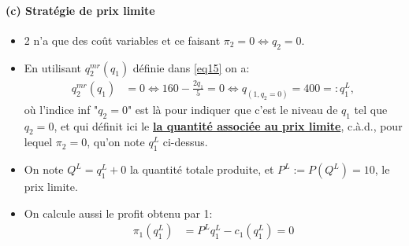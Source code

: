 \begin{frame}[allowframebreaks]{\insertsection}
\framesubtitle{(c) Stratégie de prix limite}
\begin{itemize}
\item 2 n'a que des coût variables et ce faisant $\pi_2 = 0 \Leftrightarrow q_2 = 0$.  
\item En utilisant  $q_2^{mr}(q_1)$ définie dans \eqref{eq15} on a: 
\begin{align*}
    q_2^{mr}(q_1) &= 0 \Leftrightarrow 160 - \frac{2q_1}{5} = 0 \Leftrightarrow q_{(1, q_2=0)} = 400=:q_1^L,
\end{align*}
où l'indice inf "$q_2=0$" est là pour indiquer que c'est le niveau de $q_1$ tel que $q_2=0$,  et 
qui définit ici le \textbf{\underline{la quantité associée au prix limite}}, c.à.d., pour lequel $\pi_2=0$, qu'on note $q_1^L$ ci-dessus. 
\item On note $Q^L = q_1^L + 0$ la quantité totale produite, et $P^L:=P(Q^L) = 10$, le prix limite.
\item On calcule aussi le profit obtenu par 1: 
\begin{align*}
    \pi_1(q_1^L)&=P^L q_1^L - c_1(q_1^L) = 0
\end{align*}
\end{itemize}
\end{frame}

